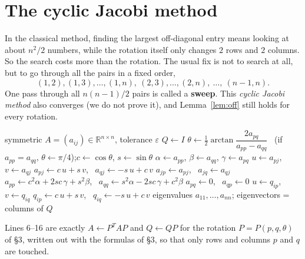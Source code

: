 \documentclass[11pt,a4paper]{article}
\theoremstyle{definition}
\theoremstyle{remark}
\newcommand{\R}{\mathbb{R}}
\newcommand{\norm}[1]{\left\lVert #1\right\rVert}
\newcommand{\off}{\operatorname{off}}
\begin{document}
\section{The cyclic Jacobi method}
In the classical method, finding the largest off-diagonal entry means looking at about $n^2/2$ numbers,
while the rotation itself only changes $2$ rows and $2$ columns. So the search costs more than the rotation.
The usual fix is not to search at all, but to go through all the pairs in a fixed order,
\[
(1,2),(1,3),\dots,(1,n),\ (2,3),\dots,(2,n),\ \dots,\ (n-1,n).
\]
One pass through all $n(n-1)/2$ pairs is called a \textbf{sweep}. This \emph{cyclic Jacobi method} also converges
(we do not prove it), and Lemma~\ref{lem:off} still holds for every rotation.

\begin{algorithm}[h]
\caption{Cyclic Jacobi method}\label{alg:jac}
\begin{algorithmic}[1]
\Require symmetric $A=(a_{ij})\in\R^{n\times n}$, tolerance $\varepsilon$
\State $Q\gets I$ 
\While{$\off(A)>\varepsilon\norm{A}_F$}
        \State $\theta\gets\frac12\arctan\dfrac{2a_{pq}}{a_{pp}-a_{qq}}$ \ (if $a_{pp}=a_{qq}$, $\theta\gets\pi/4$);\quad $c\gets\cos\theta$, $s\gets\sin\theta$
        \State $\alpha\gets a_{pp}$, $\beta\gets a_{qq}$, $\gamma\gets a_{pq}$ 
         
          \State $u\gets a_{pj}$, $v\gets a_{qj}$
          \State $a_{pj}\gets c\,u+s\,v$, \ $a_{qj}\gets -s\,u+c\,v$
          \State $a_{jp}\gets a_{pj}$, \ $a_{jq}\gets a_{qj}$ 
        \EndFor
        \State $a_{pp}\gets c^2\alpha+2sc\,\gamma+s^2\beta$, \ $a_{qq}\gets s^2\alpha-2sc\,\gamma+c^2\beta$
        \State $a_{pq}\gets0$, \ $a_{qp}\gets0$
         
          \State $u\gets q_{ip}$, $v\gets q_{iq}$
          \State $q_{ip}\gets c\,u+s\,v$, \ $q_{iq}\gets -s\,u+c\,v$
        \EndFor
      \EndIf
    \EndFor
  \EndFor
\EndWhile
\State \Return eigenvalues $a_{11},\dots,a_{nn}$; eigenvectors = columns of $Q$
\end{algorithmic}
\end{algorithm}

\noindent Lines 6--16 are exactly $A\gets P^TAP$ and $Q\gets QP$ for the rotation $P=P(p,q,\theta)$ of \S3, written out with the
formulas of \S3, so that only rows and columns $p$ and $q$ are touched.
\end{document}
